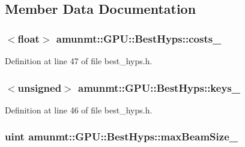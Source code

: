 \subsection{Member Data Documentation}
\subsubsection[{\texorpdfstring{costs\+\_\+}{costs_}}]{$<$float$>$ amunmt\+::\+G\+P\+U\+::\+Best\+Hyps\+::costs\+\_\+\hspace{0.3cm}{\ttfamily [private]}}\hypertarget{classamunmt_1_1GPU_1_1BestHyps_a6e995c778cdfdd7fcec7ed83fa66e0f7}{}\label{classamunmt_1_1GPU_1_1BestHyps_a6e995c778cdfdd7fcec7ed83fa66e0f7}


Definition at line 47 of file best\+\_\+hyps.\+h.

\subsubsection[{\texorpdfstring{keys\+\_\+}{keys_}}]{$<$unsigned$>$ amunmt\+::\+G\+P\+U\+::\+Best\+Hyps\+::keys\+\_\+\hspace{0.3cm}{\ttfamily [private]}}\hypertarget{classamunmt_1_1GPU_1_1BestHyps_a0208d7c0fa0130e0466f4180c6a691e8}{}\label{classamunmt_1_1GPU_1_1BestHyps_a0208d7c0fa0130e0466f4180c6a691e8}


Definition at line 46 of file best\+\_\+hyps.\+h.

\subsubsection[{\texorpdfstring{max\+Beam\+Size\+\_\+}{maxBeamSize_}}]{\setlength{\rightskip}{0pt plus 5cm}uint amunmt\+::\+G\+P\+U\+::\+Best\+Hyps\+::max\+Beam\+Size\+\_\+\hspace{0.3cm}{\ttfamily [private]}}\hypertarget{classamunmt_1_1GPU_1_1BestHyps_a76edd802101677a575af499aab958722}{}\label{classamunmt_1_1GPU_1_1BestHyps_a76edd802101677a575af499aab958722}


